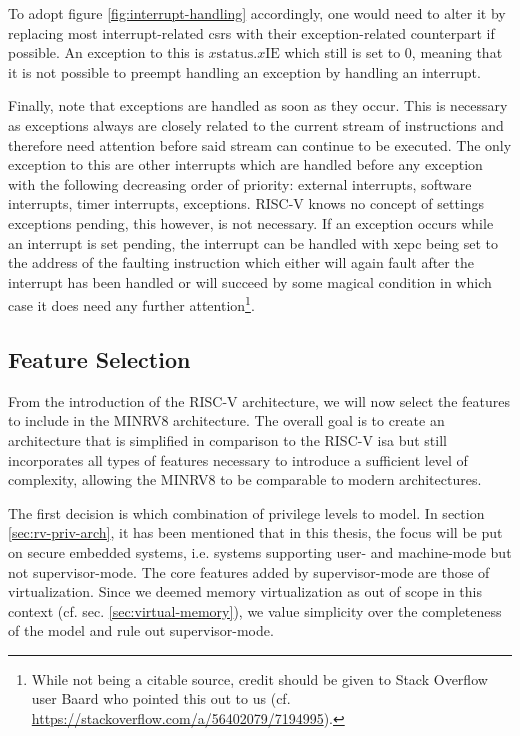 To adopt figure \ref{fig:interrupt-handling} accordingly, one would need to alter it by replacing most interrupt-related \glspl{csr} with their exception-related counterpart if possible.
An exception to this is $ x\text{status}.x\text{IE} $ which still is set to 0, meaning that it is not possible to preempt handling an exception by handling an interrupt.

Finally, note that exceptions are handled as soon as they occur.
This is necessary as exceptions always are closely related to the current stream of instructions and therefore need attention before said stream can continue to be executed.
The only exception to this are other interrupts which are handled before any exception with the following decreasing order of priority: external interrupts, software interrupts, timer interrupts, exceptions.
RISC-V knows no concept of settings exceptions pending, this however, is not necessary.
If an exception occurs while an interrupt is set pending, the interrupt can be handled with \gls{xepc} being set to the address of the faulting instruction which either will again fault after the interrupt has been handled or will succeed by some magical condition in which case it does need any further attention\footnote{
    While not being a citable source, credit should be given to Stack Overflow user Baard who pointed this out to us (cf. \url{https://stackoverflow.com/a/56402079/7194995}).
}.

\subsection{Feature Selection}
\label{sec:risc-v-selection}

From the introduction of the RISC-V architecture, we will now select the features to include in the MINRV8 architecture.
The overall goal is to create an architecture that is simplified in comparison to the RISC-V \gls{isa} but still incorporates all types of features necessary to introduce a sufficient level of complexity, allowing the MINRV8 to be comparable to modern architectures.

The first decision is which combination of privilege levels to model.
In section \ref{sec:rv-priv-arch}, it has been mentioned that in this thesis, the focus will be put on secure embedded systems, i.e. systems supporting user- and machine-mode but not supervisor-mode.
The core features added by supervisor-mode are those of virtualization.
Since we deemed memory virtualization as out of scope in this context (cf. sec. \ref{sec:virtual-memory}), we value simplicity over the completeness of the model and rule out supervisor-mode.

